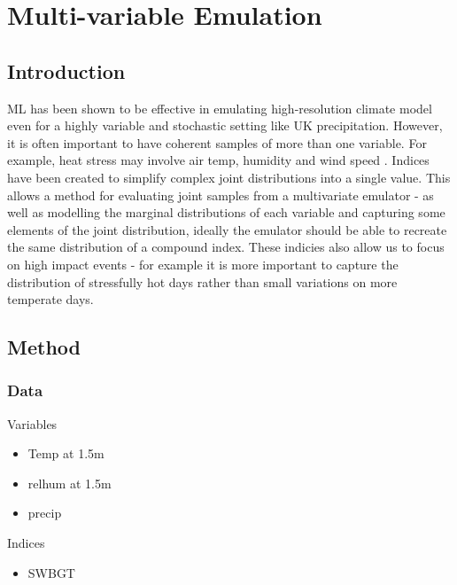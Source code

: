\let\textcircled=\pgftextcircled
\chapter{Multi-variable Emulation}
\label{chap:mv}

\section{Introduction}

ML has been shown to be effective in emulating high-resolution climate model even for a highly variable and stochastic setting like UK precipitation.
However, it is often important to have coherent samples of more than one variable. For example, heat stress may involve air temp, humidity and wind speed \cite{Blazejczyk2012UTCIcomparison}. Indices have been created to simplify complex joint distributions into a single value. This allows a method for evaluating joint samples from a multivariate emulator - as well as modelling the marginal distributions of each variable and capturing some elements of the joint distribution, ideally the emulator should be able to recreate the same distribution of a compound index.
These indicies also allow us to focus on high impact events - for example it is more important to capture the distribution of stressfully hot days rather than small variations on more temperate days.

\section{Method}

\subsection{Data}

Variables

\begin{itemize}
    \item Temp at 1.5m
    \item relhum at 1.5m
    \item precip
\end{itemize}

Indices

\begin{itemize}
    \item SWBGT
\end{itemize}